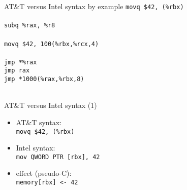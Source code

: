 \usetikzlibrary{matrix}

\begin{frame}[label=allAttExes]{AT\&T versus Intel syntax by example}
\fontsize{13}{14}\selectfont
{\tt {\keywordstyle movq} \$42, (\%rbx)} \\
 \\
{\tt {\keywordstyle subq} \%rax, \%r8} \\
 \\
{\tt {\keywordstyle movq} \$42, {100}({\%rbx},{\%rcx,4})} \\
 \\
{\tt {\keywordstyle jmp} *\%rax} \\
\hspace{4cm} {\tt {\keywordstyle jmp} rax} \\
{\tt {\keywordstyle jmp} *1000(\%rax,\%rbx,8)} \\
 \\
\end{frame}

\begin{frame}{AT\&T versus Intel syntax (1)}
    \begin{itemize}
    \item AT\&T syntax: \\ {\tt {\keywordstyle movq} \$42, (\%rbx)}
    \item Intel syntax: \\ {\tt {\keywordstyle mov} QWORD PTR [rbx], 42}
    \item effect (pseudo-C): \\ {\tt memory[rbx] <- 42}
    \end{itemize}
\end{frame}

